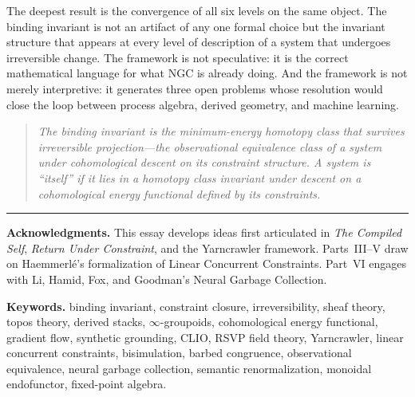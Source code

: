 \documentclass[11pt, letterpaper]{article}
\theoremstyle{plain}
\theoremstyle{definition}
\theoremstyle{remark}
\begin{document}
The deepest result is the convergence of all six levels on the same object. The binding
invariant is not an artifact of any one formal choice but the invariant structure that
appears at every level of description of a system that undergoes irreversible change.
The framework is not speculative: it is the correct mathematical language for what NGC
is already doing. And the framework is not merely interpretive: it generates three open
problems whose resolution would close the loop between process algebra, derived geometry,
and machine learning.

\begin{quote}
\itshape
The binding invariant is the minimum-energy homotopy class that survives irreversible
projection---the observational equivalence class of a system under cohomological descent
on its constraint structure. A system is ``itself'' if it lies in a homotopy class
invariant under descent on a cohomological energy functional defined by its constraints.
\end{quote}

\vspace{2em}
\hrule
\vspace{10em}

\noindent\textbf{Acknowledgments.}
This essay develops ideas first articulated in \emph{The Compiled Self},
\emph{Return Under Constraint}, and the Yarncrawler framework. Parts~III--V draw on
Haemmerl\'e's formalization of Linear Concurrent Constraints. Part~VI engages with
Li, Hamid, Fox, and Goodman's Neural Garbage Collection.

\vspace{1em}
\noindent\textbf{Keywords.}
binding invariant, constraint closure, irreversibility, sheaf theory, topos theory,
derived stacks, $\infty$-groupoids, cohomological energy functional, gradient flow,
synthetic grounding, CLIO, RSVP field theory, Yarncrawler, linear concurrent
constraints, bisimulation, barbed congruence, observational equivalence, neural garbage
collection, semantic renormalization, monoidal endofunctor, fixed-point algebra.
\end{document}
